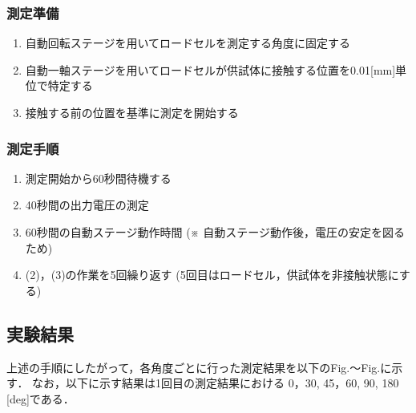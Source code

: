 \subsubsection{測定準備}
\begin{enumerate}[(1)]
	\item 自動回転ステージを用いてロードセルを測定する角度に固定する
	\item 自動一軸ステージを用いてロードセルが供試体に接触する位置を0.01[mm]単位で特定する
	\item 接触する前の位置を基準に測定を開始する
\end{enumerate}
\subsubsection{測定手順}
\begin{enumerate}[(1)]
	\item 測定開始から60秒間待機する
	\item 40秒間の出力電圧の測定
	\item 60秒間の自動ステージ動作時間 (※ 自動ステージ動作後，電圧の安定を図るため)
	\item (2)，(3)の作業を5回繰り返す (5回目はロードセル，供試体を非接触状態にする)
\end{enumerate}

\subsection{実験結果}

上述の手順にしたがって，各角度ごとに行った測定結果を以下のFig.～Fig.に示す．
なお，以下に示す結果は1回目の測定結果における 0，30, 45，60, 90, 180 [deg]である．

